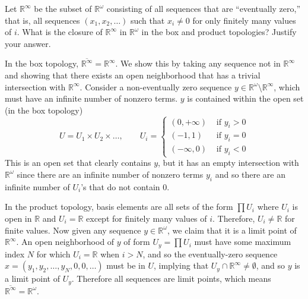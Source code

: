   \begin{exercise}[Munkres 19.7]
    Let $\mathbb{R}^\infty$ be the subset of $\mathbb{R}^\omega$ consisting of all sequences that are ``eventually zero,'' that is, all sequences $(x_1, x_2, \ldots)$ such that $x_i \neq 0$ for only finitely many values of $i$. What is the closure of $\mathbb{R}^\infty$ in $\mathbb{R}^\omega$ in the box and product topologies? Justify your answer.
  \end{exercise}
  \begin{solution}
    In the box topology, $\overline{\mathbb{R}^\infty} = \mathbb{R}^\infty$. We show this by taking any sequence not in $\mathbb{R}^\infty$ and showing that there exists an open neighborhood that has a trivial intersection with $\mathbb{R}^\infty$. Consider a non-eventually zero sequence $y \in \mathbb{R}^\omega \setminus \mathbb{R}^\infty$, which must have an infinite number of nonzero terms. $y$ is contained within the open set (in the box topology) 
    \begin{equation}
      U = U_1 \times U_2 \times \ldots, \qquad U_i = 
      \begin{cases}
        (0, +\infty) & \text{ if } y_i > 0 \\
        (-1, 1)  & \text{ if } y_i = 0 \\
        (-\infty, 0) & \text{ if } y_i < 0
      \end{cases}
    \end{equation}
    This is an open set that clearly contains $y$, but it has an empty intersection with $\mathbb{R}^\omega$ since there are an infinite number of nonzero terms $y_i$ and so there are an infinite number of $U_i$'s that do not contain $0$. 

    In the product topology, basis elements are all sets of the form $\prod U_i$ where $U_i$ is open in $\mathbb{R}$ and $U_i = \mathbb{R}$ except for finitely many values of $i$. Therefore, $U_i \neq \mathbb{R}$ for finite values. Now given any sequence $y \in \mathbb{R}^\omega$, we claim that it is a limit point of $\mathbb{R}^\infty$. An open neighborhood of $y$ of form $U_y = \prod U_i$ must have some maximum index $N$ for which $U_i = \mathbb{R}$ when $i > N$, and so the eventually-zero sequence $x = (y_1, y_2, \ldots, y_N, 0, 0 ,\ldots)$ must be in $U$, implying that $U_y \cap \mathbb{R}^\infty \neq \emptyset$, and so $y$ is a limit point of $U_y$. Therefore all sequences are limit points, which means $\overline{\mathbb{R}^\infty} = \mathbb{R}^\omega$. 
  \end{solution}

